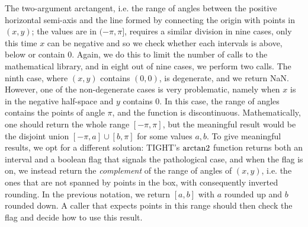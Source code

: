 The two-argument arctangent, i.e. the range of angles between the positive horizontal semi-axis and the line formed by connecting the origin with points in $(x,y)$; the values are in $(-\pi,\pi]$, requires a similar division in nine cases, only this time $x$ can be negative and so we check whether each intervals is above, below or contain 0.
Again, we do this to limit the number of calls to the mathematical library, and in eight out of nine cases, we perform two calls. The ninth case, where $(x,y)$ contains $(0,0)$, is degenerate, and we return NaN.
However, one of the non-degenerate cases is very problematic, namely when $x$ is in the negative half-space and $y$ contains 0. In this case, the range of angles contains the points of angle $\pi$, and the function is discontinuous. Mathematically, one should return the whole range $[-\pi,\pi]$, but the meaningful result would be the disjoint union $[-\pi, a]\cup[b, \pi]$ for some values $a,b$.
To give meaningful results, we opt for a different solution: TIGHT's $\operatorname{arctan2}$ function returns both an interval and a boolean flag that signals the pathological case, and when the flag is on, we instead return the \emph{complement} of the range of angles of $(x,y)$, i.e. the ones that are not spanned by points in the box, with consequently inverted rounding. In the previous notation, we return $[a,b]$ with $a$ rounded up and $b$ rounded down. A caller that expects points in this range should then check the flag and decide how to use this result.
